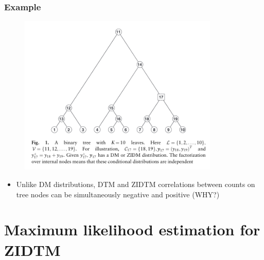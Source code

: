 \documentclass{beamer}
\begin{document}
\begin{frame}
\frametitle{Example}
\begin{figure}[!htb]
	\centering
	\includegraphics[width=0.85\textwidth]{img/tree_example.png}
\end{figure}
\begin{itemize}
  \item Unlike DM distributions, DTM and ZIDTM correlations between counts on tree nodes can be simultaneously negative and positive (WHY?)
\end{itemize}
\end{frame}



\section{Maximum likelihood estimation for ZIDTM}
\end{document}
